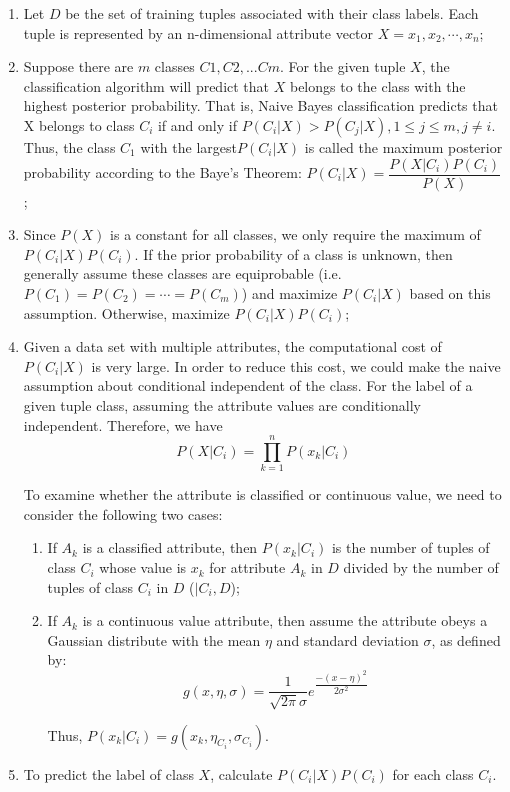 \documentclass[sigconf]{acmart}
\begin{document}
\begin{enumerate}
    \item Let $D$ be the set of training tuples associated with their class labels. Each tuple is represented by an n-dimensional attribute vector $X={x_1,x_2,\cdots,x_n}$;
    \item Suppose there are $m$ classes $C1, C2, ... Cm$. For the given tuple $X$, the classification algorithm will predict that $X$ belongs to the class with the highest posterior probability. That is, Naive Bayes classification predicts that X belongs to class $C_i$ if and only if $P(C_i|X)>P(C_j|X), 1 \leq j\leq m, j \neq i$. Thus, the class $C_1$ with the largest$P(C_i|X)$ is called the maximum posterior probability according to the Baye's Theorem: $P(C_i|X)=\dfrac{P(X|C_i)P(C_i)}{P(X)}$;
    \item Since $P(X)$ is a constant for all classes, we only require the maximum of $P(C_i|X)P(C_i)$. If the prior probability of a class is unknown, then generally assume these classes are equiprobable (i.e. $P(C_1)=P(C_2)=\cdots= P(C_m)$) and maximize $P(C_i|X)$ based on this assumption. Otherwise, maximize $P(C_i|X)P(C_i)$;
    \item Given a data set with multiple attributes, the computational cost of $P(C_i|X)$ is very large. In order to reduce this cost, we could make the naive assumption about conditional independent of the class. For the label of a given tuple class, assuming the attribute values are conditionally independent. Therefore, we have
    \[
        P(X|C_i)=\prod_{k=1}^{n}P(x_k|C_i)
    \]
    
    To examine whether the attribute is classified or continuous value, we need to consider the following two cases:
    \begin{enumerate}
        \item If $A_k$ is a classified attribute, then $P(x_k|C_i)$ is the number of tuples of class $C_i$ whose value is $x_k$ for attribute $A_k$ in $D$ divided by the number of tuples of class $C_i$ in $D$ ($|C_i,D$);
        \item If $A_k$ is a continuous value attribute, then assume the attribute obeys a Gaussian distribute with the mean $\eta$ and standard deviation $\sigma$, as defined by:
        \[
            g(x,\eta,\sigma)=\dfrac{1}{\sqrt{2\pi}\sigma}e^{\dfrac{-(x-\eta)^2}{2\sigma^2}}
        \]
        
        Thus, $P(x_k|C_i)=g(x_k,\eta_{C_i},\sigma_{C_i})$.
    \end{enumerate}
    \item To predict the label of class $X$, calculate $P(C_i|X)P(C_i)$ for each class $C_i$.
\end{enumerate}
\end{document}
